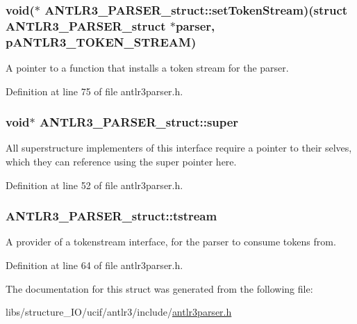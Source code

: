 \hypertarget{struct_a_n_t_l_r3___p_a_r_s_e_r__struct_ac0aeae763a29f853540f17c0bc13907a}{
\subsubsection[{set\-Token\-Stream}]{\setlength{\rightskip}{0pt plus 5cm}void($\ast$ A\-N\-T\-L\-R3\-\_\-\-P\-A\-R\-S\-E\-R\-\_\-struct\-::set\-Token\-Stream)(struct {\bf A\-N\-T\-L\-R3\-\_\-\-P\-A\-R\-S\-E\-R\-\_\-struct} $\ast$parser, {\bf p\-A\-N\-T\-L\-R3\-\_\-\-T\-O\-K\-E\-N\-\_\-\-S\-T\-R\-E\-A\-M})}}\label{struct_a_n_t_l_r3___p_a_r_s_e_r__struct_ac0aeae763a29f853540f17c0bc13907a}
A pointer to a function that installs a token stream for the parser. 

Definition at line 75 of file antlr3parser.\-h.

\hypertarget{struct_a_n_t_l_r3___p_a_r_s_e_r__struct_ab6f7f468e985aec5ab97d1a234f5d77b}{
\subsubsection[{super}]{\setlength{\rightskip}{0pt plus 5cm}void$\ast$ A\-N\-T\-L\-R3\-\_\-\-P\-A\-R\-S\-E\-R\-\_\-struct\-::super}}\label{struct_a_n_t_l_r3___p_a_r_s_e_r__struct_ab6f7f468e985aec5ab97d1a234f5d77b}
All superstructure implementers of this interface require a pointer to their selves, which they can reference using the super pointer here. 

Definition at line 52 of file antlr3parser.\-h.

\hypertarget{struct_a_n_t_l_r3___p_a_r_s_e_r__struct_af6bef8139a4d947288cfc416bcde3db4}{
\subsubsection[{tstream}]{ A\-N\-T\-L\-R3\-\_\-\-P\-A\-R\-S\-E\-R\-\_\-struct\-::tstream}}\label{struct_a_n_t_l_r3___p_a_r_s_e_r__struct_af6bef8139a4d947288cfc416bcde3db4}
A provider of a tokenstream interface, for the parser to consume tokens from. 

Definition at line 64 of file antlr3parser.\-h.



The documentation for this struct was generated from the following file\-:\begin{DoxyCompactItemize}
\item 
libs/structure\-\_\-\-I\-O/ucif/antlr3/include/\hyperlink{antlr3parser_8h}{antlr3parser.\-h}\end{DoxyCompactItemize}
